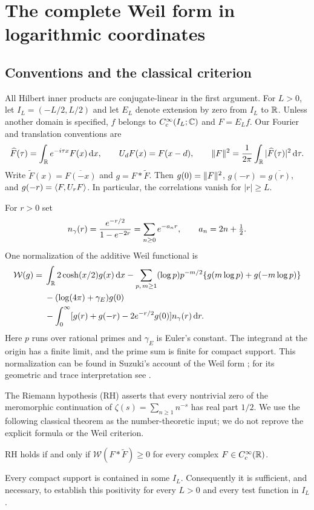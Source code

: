 \section{The complete Weil form in logarithmic coordinates}\label{sec:weil}
\subsection{Conventions and the classical criterion}
All Hilbert inner products are conjugate-linear in the first argument.
For $L>0$, let $I_L=(-L/2,L/2)$ and let $E_L$ denote extension by zero
from $I_L$ to $\mathbb R$. Unless another domain is specified, $f$ belongs to
$C_c^\infty(I_L;\mathbb C)$ and $F=E_Lf$. Our Fourier and translation
conventions are
\begin{equation}\label{eq:fourier}
 \widehat F(\tau)=\int_\mathbb R e^{-i\tau x}F(x)\,\mathrm d x,
 \qquad U_dF(x)=F(x-d),\qquad
 \lVert F\rVert^2=\frac1{2\pi}\int_\mathbb R|\widehat F(\tau)|^2\,\mathrm d\tau.
\end{equation}
Write $\widetilde F(x)=\overline{F(-x)}$ and $g=F*\widetilde F$.
Then $g(0)=\lVert F\rVert^2$, $g(-r)=\overline{g(r)}$, and
$g(-r)=\langle F,U_rF\rangle$. In particular, the correlations vanish for $|r|\geq L$.

For $r>0$ set
\begin{equation}\label{eq:gamma-kernel}
 n_{\gamma}(r)=\frac{e^{-r/2}}{1-e^{-2r}}
 =\sum_{n\geq0}e^{-a_nr},\qquad a_n=2n+\tfrac12.
\end{equation}
One normalization of the additive Weil functional is
\begin{align}
 \mathcal W(g)={}&\int_\mathbb R 2\cosh(x/2)g(x)\,\mathrm d x
 -\sum_{p,\,m\geq1}(\log p)p^{-m/2}
       \{g(m\log p)+g(-m\log p)\}\notag\\
 &-(\log(4\pi)+\gamma_E)g(0)\notag\\
 &-\int_0^\infty
       [g(r)+g(-r)-2e^{-r/2}g(0)]n_{\gamma}(r)\,\mathrm d r.
 \label{eq:weil-functional}
\end{align}
Here $p$ runs over rational primes and $\gamma_E$ is Euler's constant.
The integrand at the origin has a finite limit, and the prime sum is
finite for compact support. This normalization can be found in
Suzuki's account of the Weil form \cite[Section 1.1]{Suzuki}; for its
geometric and trace interpretation see \cite{CCM}.

The Riemann hypothesis (RH) asserts that every nontrivial zero of the
meromorphic continuation of $\zeta(s)=\sum_{n\geq1}n^{-s}$ has real
part $1/2$. We use the following classical theorem as the number-theoretic
input; we do not reprove the explicit formula or the Weil criterion.
\begin{theorem}\label{thm:weil}
RH holds if and only if $\mathcal W(F*\widetilde F)\geq0$ for every
complex $F\in C_c^\infty(\mathbb R)$.
\end{theorem}
Every compact support is contained in some $I_L$. Consequently it is
sufficient, and necessary, to establish this positivity for every $L>0$
and every test function in $I_L$.

